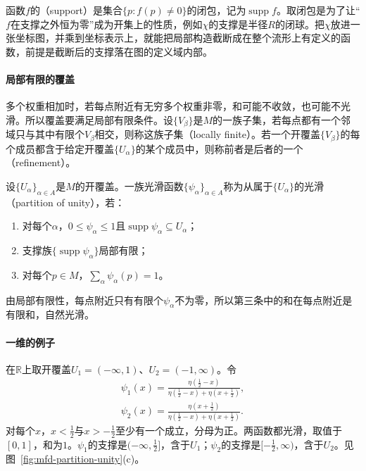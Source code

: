 函数$f$的（support）是集合$\{p:f(p)\neq0\}$的闭包，记为$\operatorname{supp}f$。取闭包是为了让“$f$在支撑之外恒为零”成为开集上的性质，例如$\chi$的支撑是半径$R$的闭球。把$\chi$放进一张坐标图，并乘到坐标表示上，就能把局部构造截断成在整个流形上有定义的函数，前提是截断后的支撑落在图的定义域内部。

\paragraph{局部有限的覆盖}
多个权重相加时，若每点附近有无穷多个权重非零，和可能不收敛，也可能不光滑。所以覆盖要满足局部有限条件。设$\{V_\beta\}$是$M$的一族子集，若每点都有一个邻域只与其中有限个$V_\beta$相交，则称这族子集（locally finite）。若一个开覆盖$\{V_\beta\}$的每个成员都含于给定开覆盖$\{U_\alpha\}$的某个成员中，则称前者是后者的一个（refinement）。

\begin{definition}[光滑单位分解]
\label{def:mfd-partition-unity}
设$\{U_\alpha\}_{\alpha\in A}$是$M$的开覆盖。一族光滑函数$\{\psi_\alpha\}_{\alpha\in A}$称为从属于$\{U_\alpha\}$的光滑（partition of unity），若：
\begin{enumerate}
\item 对每个$\alpha$，$0\leq\psi_\alpha\leq1$且$\operatorname{supp}\psi_\alpha\subseteq U_\alpha$；
\item 支撑族$\{\operatorname{supp}\psi_\alpha\}$局部有限；
\item 对每个$p\in M$，$\sum_{\alpha}\psi_\alpha(p)=1$。
\end{enumerate}
\end{definition}

由局部有限性，每点附近只有有限个$\psi_\alpha$不为零，所以第三条中的和在每点附近是有限和，自然光滑。

\paragraph{一维的例子}
在$\mathbb R$上取开覆盖$U_1=(-\infty,1)$、$U_2=(-1,\infty)$。令
\begin{equation}
\begin{gathered}
\psi_1(x)=\frac{\eta(\tfrac12-x)}{\eta(\tfrac12-x)+\eta(x+\tfrac12)},\\
\psi_2(x)=\frac{\eta(x+\tfrac12)}{\eta(\tfrac12-x)+\eta(x+\tfrac12)} .
\end{gathered}
\label{eq:mfd-partition-example}
\end{equation}
对每个$x$，$x<\tfrac12$与$x>-\tfrac12$至少有一个成立，分母为正。两函数都光滑，取值于$[0,1]$，和为$1$。$\psi_1$的支撑是$(-\infty,\tfrac12]$，含于$U_1$；$\psi_2$的支撑是$[-\tfrac12,\infty)$，含于$U_2$。见图~\ref{fig:mfd-partition-unity}(c)。

